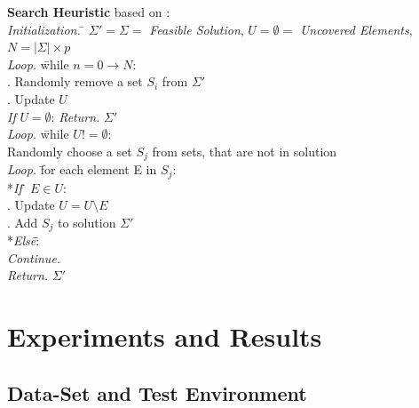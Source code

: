 \documentclass[a4paper]{article}
\begin{document}
\begin{tabbing}
\textbf{Search Heuristic} based on \cite{Jacobs1995}: \\
\textit{Initialization.} \= $\Sigma' = \Sigma = $ \textit{Feasible Solution}, $U = \emptyset =$ \textit{Uncovered Elements},\\
                         \> $N = |\Sigma| \times p $ \\
\textit{Loop.} \= while $n = 0 \xrightarrow{} N: $\\
. Randomly remove a set $S_i$ from $\Sigma'$\\
. Update $U$ \\
\textit{If} $U = \emptyset$: \textit{Return.} $\Sigma'$ \\
\textit{Loop.} \= while $U != \emptyset$:\\
\>              Randomly choose a set $S_j$ from sets, that are not in solution \\
\>              \textit{Loop. }\= for each element E in $S_j$: \\
\>              \>      *\textit{If }\= $E \in U$: \\
\>              \>      . Update $U = U \setminus E$  \\
\>              \>      . Add $S_j$ to solution $\Sigma'$\\
\>              \>      *\textit{Els\=e}\= :\\
\>              \>      \>              \textit{Continue.} \\
\textit{Return.} $\Sigma'$
\end{tabbing}


\section{Experiments and Results}

\subsection{Data-Set and Test Environment}
\end{document}
